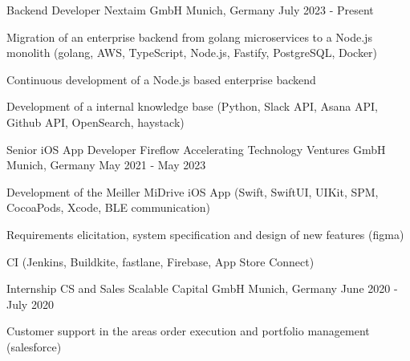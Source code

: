 


\begin{cventries}


\cventry
{Backend Developer} %
{Nextaim GmbH} %
{Munich, Germany} %
{July 2023 - Present} %
{ %
\begin{cvitems}
\item {Migration of an enterprise backend from golang microservices to a Node.js monolith (golang, AWS, TypeScript, Node.js, Fastify, PostgreSQL, Docker)}
\item {Continuous development of a Node.js based enterprise backend}
\item {Development of a internal knowledge base (Python, Slack API, Asana API, Github API, OpenSearch, haystack)}
\end{cvitems}
}


\cventry
{Senior iOS App Developer} %
{Fireflow Accelerating Technology Ventures GmbH} %
{Munich, Germany} %
{May 2021 - May 2023} %
{ %
\begin{cvitems}
\item {Development of the Meiller MiDrive iOS App (Swift, SwiftUI, UIKit, SPM, CocoaPods, Xcode, BLE communication)}
\item {Requirements elicitation, system specification and design of new features (figma)}
\item {CI (Jenkins, Buildkite, fastlane, Firebase, App Store Connect)}
\end{cvitems}
}


\cventry
{Internship CS and Sales} %
{Scalable Capital GmbH} %
{Munich, Germany} %
{June 2020 - July 2020} %
{ %
\begin{cvitems}
\item {Customer support in the areas order execution and portfolio management (salesforce)}
\end{cvitems}
}


\end{cventries}

